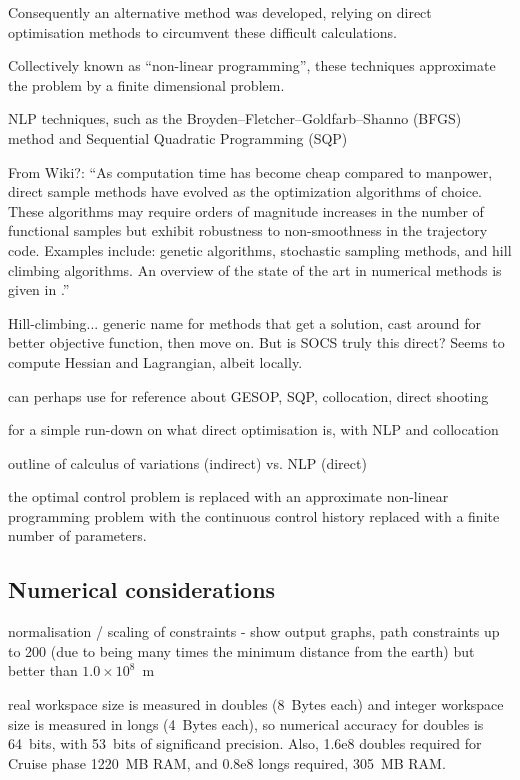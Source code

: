 Consequently an alternative method was developed, relying on direct optimisation methods to circumvent these difficult calculations. 

Collectively known as \enquote{non-linear programming}, these techniques approximate the problem by a finite dimensional problem.

NLP techniques, such as the Broyden–Fletcher–Goldfarb–Shanno (BFGS) method and Sequential Quadratic Programming (SQP)

From Wiki?:
\enquote{As computation time has become cheap compared to manpower, direct sample methods have evolved as the optimization algorithms of choice. These algorithms may require orders of magnitude increases in the number of functional samples but exhibit robustness to non-smoothness in the trajectory code. Examples include: genetic algorithms\parencite{Hughes2004,Vasile2009}, stochastic sampling methods, and hill climbing algorithms. An overview of the state of the art in numerical methods is given in \textcite{Betts1998}.}

\cite{Betts2002}

\textcite{SOCS_guide}

\textcite{ASTOS_guide}

Hill-climbing... generic name for methods that get a solution, cast around for better objective function, then move on. But is SOCS truly this direct? Seems to compute Hessian and Lagrangian, albeit locally.

can perhaps use \cite{Well2001} for reference about GESOP, SQP, collocation, direct shooting

\cite{Hargraves1987} for a simple run-down on what direct optimisation is, with NLP and collocation

\textcite{Enright1992} outline of calculus of variations (indirect) vs. NLP (direct)

the optimal control problem is replaced with an approximate non-linear programming problem with the continuous control history replaced with a finite number of parameters.

\subsection{Numerical considerations}
normalisation / scaling of constraints - show output graphs, path constraints up to 200 (due to being many times the minimum distance from the earth) but better than $1.0\times10^8$~m 

real workspace size is measured in doubles (8~Bytes each) and integer workspace size is measured in longs (4~Bytes each), so numerical accuracy for doubles is 64~bits, with 53~bits of significand precision. Also, 1.6e8 doubles required for Cruise phase 1220~MB RAM, and 0.8e8 longs required, 305~MB RAM.

